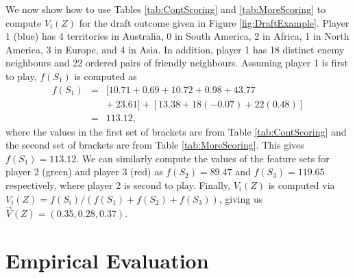 \documentclass[letterpaper]{article}
\numberwithin{equation}{section}
\numberwithin{theorem}{section}
\numberwithin{lemma}{section}
\numberwithin{df}{section}
\begin{document}
We now show how to use Tables \ref{tab:ContScoring} and \ref{tab:MoreScoring} to compute $V_i(Z)$ for the draft outcome given in Figure \ref{fig:DraftExample}.  Player 1 (blue) has 4 territories in Australia, 0 in South America, 2 in Africa, 1 in North America, 3 in Europe, and 4 in Asia.  In addition, player 1 has 18 distinct enemy neighbours and 22 ordered pairs of friendly neighbours.  Assuming player 1 is first to play, $f(S_1)$ is computed as
\begin{eqnarray*}
 	f(S_1) &=& [10.71 + 0.69 + 10.72 + 0.98 + 43.77 \\ &&+\ 23.61] + [13.38 + 18(-0.07) + 22(0.48)] \\
 				 &=& 113.12,
\end{eqnarray*}
where the values in the first set of brackets are from Table \ref{tab:ContScoring} and the second set of brackets are from Table \ref{tab:MoreScoring}.  This gives $f(S_1) = 113.12$.  We can similarly compute the values of the feature sets for player 2 (green) and player 3 (red) as %
$f(S_2) = 89.47$ and $f(S_3) = 119.65$ respectively, where player 2 is second to play.  Finally, $V_i(Z)$ is computed via $V_i(Z) = f(S_i) / \left(f(S_1) + f(S_2) + f(S_3) \right)$, giving us %
$\vec{V}(Z) = (0.35, 0.28, 0.37)$.

\section{Empirical Evaluation}
\end{document}
